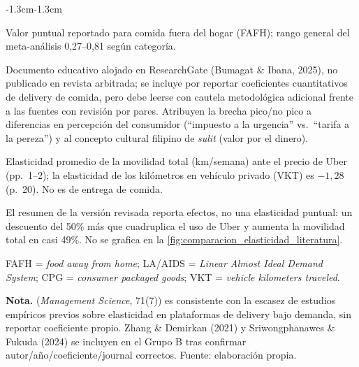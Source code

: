 \documentclass[doc, a4paper, biblatex, floatsintext, longtable, babel]{apa7}
\begin{document}
\begin{table}[!htbp]
\begin{adjustwidth}{-1.3cm}{-1.3cm}
\begin{threeparttable}
\begin{tablenotes}
\footnotesize
\item[$\dagger$] Valor puntual reportado para comida fuera del hogar (FAFH); rango general del meta-análisis 0,27--0,81 según categoría.
\item[$\ddagger$] Documento educativo alojado en ResearchGate (Bumagat \& Ibana, 2025), no publicado en revista arbitrada; se incluye por reportar coeficientes cuantitativos de delivery de comida, pero debe leerse con cautela metodológica adicional frente a las fuentes con revisión por pares. Atribuyen la brecha pico/no pico a diferencias en percepción del consumidor (``impuesto a la urgencia'' vs.\ ``tarifa a la pereza'') y al concepto cultural filipino de \textit{sulit} (valor por el dinero).
\item[$\S$] Elasticidad promedio de la movilidad total (km/semana) ante el precio de Uber (pp.~1--2); la elasticidad de los kilómetros en vehículo privado (VKT) es $-1,28$ (p.~20). No es de entrega de comida.
\item[$\P$] El resumen de la versión revisada reporta efectos, no una elasticidad puntual: un descuento del 50\% más que cuadruplica el uso de Uber y aumenta la movilidad total en casi 49\%. No se grafica en la \cref{fig:comparacion_elasticidad_literatura}.
\item[] FAFH = \textit{food away from home}; LA/AIDS = \textit{Linear Almost Ideal Demand System}; CPG = \textit{consumer packaged goods}; VKT = \textit{vehicle kilometers traveled}.
\item[] \textbf{Nota.} \textcite{li2025} (\textit{Management Science}, 71(7)) es consistente con la escasez de estudios empíricos previos sobre elasticidad en plataformas de delivery bajo demanda, sin reportar coeficiente propio. Zhang \& Demirkan (2021) y Sriwongphanawes \& Fukuda (2024) se incluyen en el Grupo B tras confirmar autor/año/coeficiente/journal correctos. Fuente: elaboración propia.
\end{tablenotes}
\end{threeparttable}
\end{adjustwidth}
\end{table}
\end{document}
